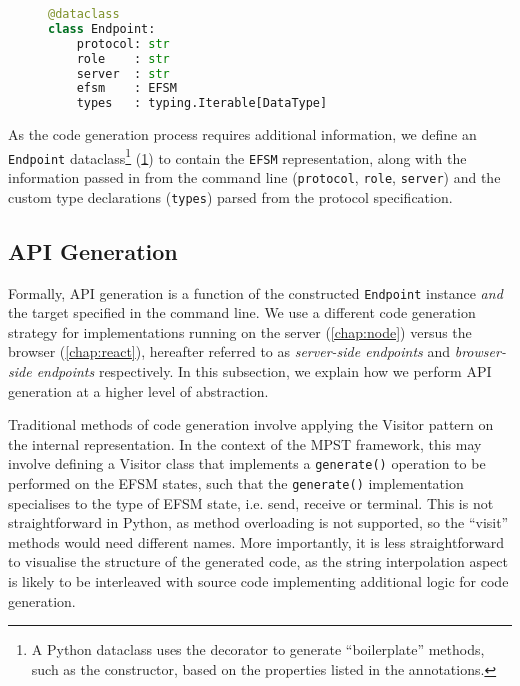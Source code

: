 \begin{figure}[!ht]
\begin{lstlisting}[language=Python]
@dataclass
class Endpoint:
    protocol: str
    role    : str
    server  : str
    efsm    : EFSM
    types   : typing.Iterable[DataType]
\end{lstlisting}
\label{lst:endpointapi}
\end{figure}

As the code generation process requires additional information,
we define an \texttt{Endpoint} dataclass\footnote{
A Python dataclass uses the decorator to generate
``boilerplate'' methods, such as the constructor, based on the
properties listed in the annotations.} (\cref{lst:endpointapi})
to contain the \texttt{EFSM}
representation, along with the information passed in from the
command line (\texttt{protocol}, \texttt{role}, \texttt{server}) 
and the custom type declarations (\texttt{types}) parsed from the
protocol specification.

\subsection{API Generation}
\label{subsection:apigen}

Formally, API generation is a function of the constructed
\texttt{Endpoint} instance
\textit{and} the target specified in the command line. We use a 
different code generation strategy for implementations running on
the server (\cref{chap:node}) versus the browser (\cref{chap:react}),
hereafter referred to as \textit{server-side endpoints} and 
\textit{browser-side endpoints} respectively.
In this subsection, we explain how we perform API generation
at a higher level of abstraction.

Traditional methods of code generation involve applying the
Visitor pattern on the internal representation. 
In the context of the MPST framework,
this may involve defining a Visitor class that implements a
\texttt{generate()} operation to be performed on the EFSM states,
such that the \texttt{generate()} implementation specialises to the
type of EFSM state, i.e. send, receive or terminal.
This is not straightforward in Python, as method overloading is not 
supported, so the ``visit'' methods would need different names.
More importantly, it is less straightforward to visualise
the structure of the generated code, as the string interpolation
aspect is likely to be interleaved with source code implementing
additional logic for code generation.

